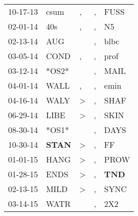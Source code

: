 \begin{supertabular}{p{0.07\textwidth}p{0.06\textwidth}p{0.02\textwidth}p{0.02\textwidth}p{0.06\textwidth}}
          10-17-13\textsuperscript{} &           csum\textsuperscript{} &                , &                , &           FUSS\textsuperscript{} \\
          02-01-14\textsuperscript{} &            40s\textsuperscript{} &                , &                , &             N5\textsuperscript{} \\
          02-13-14\textsuperscript{} &            AUG\textsuperscript{} &                  &                , &           blbc\textsuperscript{} \\
          03-05-14\textsuperscript{} &           COND\textsuperscript{} &                , &                , &           prof\textsuperscript{} \\
          03-12-14\textsuperscript{} &                            *OS2* &                  &                , &           MAIL\textsuperscript{} \\
          04-01-14\textsuperscript{} &           WALL\textsuperscript{} &                , &                , &           emin\textsuperscript{} \\
          04-16-14\textsuperscript{} &           WALY\textsuperscript{} &     \textgreater &                , &           SHAF\textsuperscript{} \\
          06-29-14\textsuperscript{} &           LIBE\textsuperscript{} &     \textgreater &                , &           SKIN\textsuperscript{} \\
          08-30-14\textsuperscript{} &                            *OS1* &                  &                , &           DAYS\textsuperscript{} \\
          10-30-14\textsuperscript{} &  \textbf{STAN\textsuperscript{}} &     \textgreater &                , &             FF\textsuperscript{} \\
          01-01-15\textsuperscript{} &           HANG\textsuperscript{} &     \textgreater &                , &           PROW\textsuperscript{} \\
          01-28-15\textsuperscript{} &           ENDS\textsuperscript{} &     \textgreater &                , &   \textbf{TND\textsuperscript{}} \\
          02-13-15\textsuperscript{} &           MILD\textsuperscript{} &     \textgreater &                , &           SYNC\textsuperscript{} \\
          03-14-15\textsuperscript{} &           WATR\textsuperscript{} &                  &                , &            2X2\textsuperscript{} \\

\end{supertabular}
